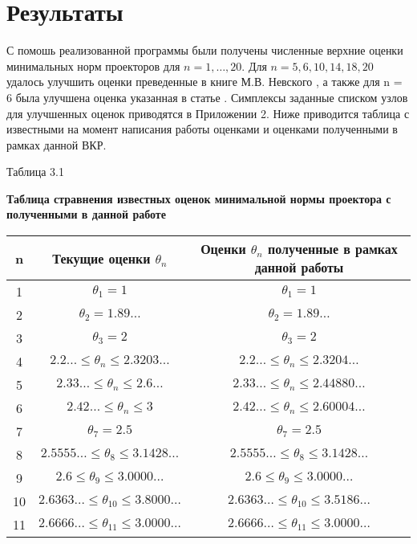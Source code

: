 \documentclass[12pt, a4paper]{extarticle}
\begin{document}
\newpage
\section{Результаты} 
С помошь реализованной программы были получены численные верхние оценки минимальных норм проекторов для $n=1,\ldots,20$. Для $n = 5,6,10,14,18,20$ удалось улучшить оценки преведенные в книге М.В. Невского \cite{1}, а также для n = 6 была улучшена оценка указанная в статье \cite{10}. Симплексы заданные списком узлов для улучшенных оценок приводятся в Приложении 2. Ниже приводится таблица с известными на момент написания работы оценками и оценками полученными в рамках данной ВКР.
\begin{flushright}
	Таблица 3.1
\end{flushright}
\begin{center}
	{\bf Таблица стравнения известных оценок минимальной нормы проектора с полученными в данной работе}
	\begin{tabular}{|c|c|c|} \hline
		n& Текущие оценки $\theta_n$ & Оценки $\theta_n$ полученные в рамках данной работы  \\ \hline
		1 & $\theta_1 = 1$ & $\theta_1 = 1$ \\ \hline
		2 & $\theta_2 = 1.89\ldots$ & $\theta_2 = 1.89\ldots$\\ \hline
		3 & $\theta_3 = 2$ & $\theta_3 = 2$\\ \hline
		4 & $2.2\ldots \leqslant\theta_n\leqslant2.3203\ldots$ & $2.2\ldots \leqslant\theta_n\leqslant2.3204\ldots$\\ \hline
		5 & $2.33\ldots \leqslant\theta_n\leqslant2.6\ldots$& $2.33\ldots \leqslant\theta_n\leqslant2.44880\ldots $\\\hline
		6 & $2.42\ldots \leqslant\theta_n\leqslant3$ & $2.42\ldots \leqslant\theta_n\leqslant2.60004\ldots$ \\ \hline
		7 & $\theta_7 = 2.5$& $\theta_7 = 2.5$ \\ \hline
		8 & $2.5555\ldots\leqslant\theta_8\leqslant3.1428\dots$ &  $2.5555\ldots\leqslant\theta_8\leqslant3.1428\dots$ \\ \hline
		9 &$2.6\leqslant\theta_9\leqslant3.0000\ldots$ & $2.6\leqslant\theta_9\leqslant3.0000\ldots$\\ \hline
		10 &$2.6363\ldots\leqslant\theta_{10}\leqslant3.8000\dots$ &$2.6363\ldots\leqslant\theta_{10}\leqslant3.5186\dots$ \\ \hline
		11 &$2.6666\ldots\leqslant\theta_{11}\leqslant3.0000\dots$ &$2.6666\ldots\leqslant\theta_{11}\leqslant3.0000\dots$  \\ \hline

\end{tabular}
\end{center}
\end{document}
